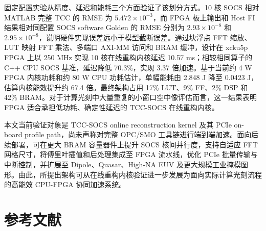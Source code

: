 \documentclass[
  preprint]{elsarticle}
\begin{document}
固定配置实验从精度、延迟和能耗三个方面验证了该划分方式。10 核 SOCS 相对
MATLAB 完整 TCC 的 RMSE 为 \(5.472\times10^{-3}\)，而 FPGA 板上输出和
Host FI 结果相对同配置 SOCS software Golden 的 RMSE 分别为
\(2.93\times10^{-8}\) 和
\(2.95\times10^{-8}\)，说明硬件实现误差远小于模型截断误差。通过块浮点
FFT 缩放、LUT 映射 FFT 乘法、多端口 AXI-MM 访问和 BRAM 缓冲，设计在
xcku5p FPGA 上以 250 MHz 实现 10 核在线重构内核延迟 10.57
ms；相较相同算子的 C++ CPU SOCS 基准，延迟降低 70.3\%，实现 3.37
倍加速。基于当前约 4 W FPGA 内核功耗和约 80 W CPU 功耗估计，单幅能耗由
2.848 J 降至 0.0423 J，估算内核能效提升约 67.4 倍。最终架构占用 17\%
LUT、9\% FF、2\% DSP 和 42\%
BRAM。对于计算光刻中大量重复的小窗口空中像评估而言，这一结果表明 FPGA
适合承担低功耗、确定性延迟的 TCC-SOCS 在线重构内核。

本文当前验证对象是 TCC-SOCS online reconstruction kernel 及其 PCIe
on-board profile path，尚未声称对完整 OPC/SMO
工具链进行端到端加速。面向后续部署，可在更大 BRAM 容量器件上提升 SOCS
核间并行度，支持自适应 FFT 网格尺寸，将傅里叶插值和后处理集成至 FPGA
流水线，优化 PCIe 批量传输与中断控制，并扩展至 Dipole、Quasar、High-NA
EUV
及更大规模工业掩模图形。由此，所提出架构可从在线重构内核验证进一步发展为面向实际计算光刻流程的高能效
CPU-FPGA 协同加速系统。

\section{参考文献}\label{ux53c2ux8003ux6587ux732e}
\end{document}
